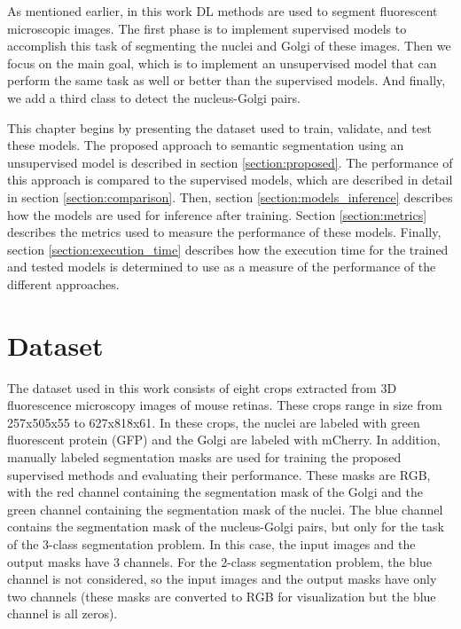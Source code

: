 \cleardoublepage
\label{chapter:methodology}

As mentioned earlier, in this work \ac{DL} methods are used to segment fluorescent microscopic images. The first phase is to implement supervised models to accomplish this task of segmenting the nuclei and Golgi of these images. Then we focus on the main goal, which is to implement an unsupervised model that can perform the same task as well or better than the supervised models. And finally, we add a third class to detect the nucleus-Golgi pairs.

This chapter begins by presenting the dataset used to train, validate, and test these models. The proposed approach to semantic segmentation using an unsupervised model is described in section \ref{section:proposed}. The performance of this approach is compared to the supervised models, which are described in detail in section \ref{section:comparison}. Then, section \ref{section:models_inference} describes how the models are used for inference after training. Section \ref{section:metrics} describes the metrics used to measure the performance of these models. Finally, section \ref{section:execution_time} describes how the execution time for the trained and tested models is determined to use as a measure of the performance of the different approaches.

\section{Dataset}
\label{section:dataset}

The dataset used in this work consists of eight crops extracted from \ac{3D} fluorescence microscopy images of mouse retinas. These crops range in size from 257x505x55 to 627x818x61. In these crops, the nuclei are labeled with green fluorescent protein (GFP) and the Golgi are labeled with mCherry. In addition, manually labeled segmentation masks are used for training the proposed supervised methods and evaluating their performance. These masks are RGB, with the red channel containing the segmentation mask of the Golgi and the green channel containing the segmentation mask of the nuclei. The blue channel contains the segmentation mask of the nucleus-Golgi pairs, but only for the task of the 3-class segmentation problem. In this case, the input images and the output masks have 3 channels. For the 2-class segmentation problem, the blue channel is not considered, so the input images and the output masks have only two channels (these masks are converted to RGB for visualization but the blue channel is all zeros).

